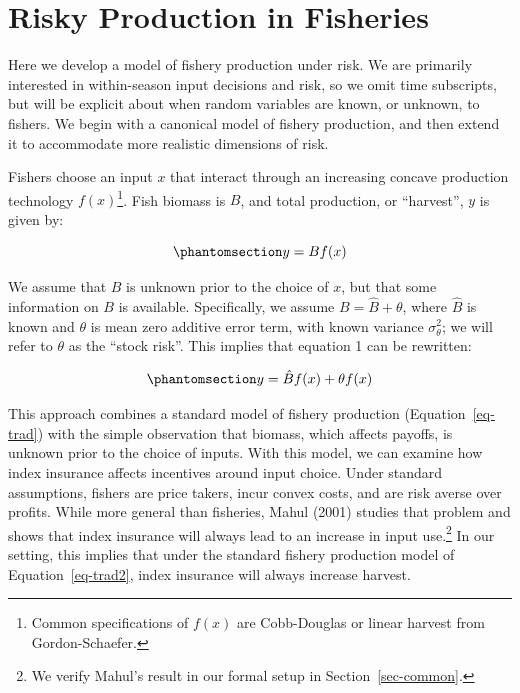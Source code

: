 \documentclass[
  letterpaper,
  DIV=11,
  numbers=noendperiod]{scrartcl}
\theoremstyle{plain}
\theoremstyle{plain}
\theoremstyle{remark}
\begin{document}
\section{Risky Production in Fisheries}\label{sec-jp}

Here we develop a model of fishery production under risk. We are
primarily interested in within-season input decisions and risk, so we
omit time subscripts, but will be explicit about when random variables
are known, or unknown, to fishers. We begin with a canonical model of
fishery production, and then extend it to accommodate more realistic
dimensions of risk.

Fishers choose an input \(x\) that interact through an increasing
concave production technology \(f(x)\)\footnote{Common specifications of
  \(f(x)\) are Cobb-Douglas or linear harvest from Gordon-Schaefer.}.
Fish biomass is \(B\), and total production, or ``harvest'', \(y\) is
given by:

\begin{equation}\phantomsection\label{eq-trad}{
y = Bf(x)
}\end{equation}

We assume that \(B\) is unknown prior to the choice of \(x\), but that
some information on \(B\) is available. Specifically, we assume
\(B=\hat{B}+\theta\), where \(\hat{B}\) is known and \(\theta\) is mean
zero additive error term, with known variance \(\sigma^2_\theta\); we
will refer to \(\theta\) as the ``stock risk''. This implies that
equation 1 can be rewritten:

\begin{equation}\phantomsection\label{eq-trad2}{
    y = \hat{B}f(x) + \theta f(x)
}\end{equation}

This approach combines a standard model of fishery production
(Equation~\ref{eq-trad}) with the simple observation that biomass, which
affects payoffs, is unknown prior to the choice of inputs. With this
model, we can examine how index insurance affects incentives around
input choice. Under standard assumptions, fishers are price takers,
incur convex costs, and are risk averse over profits. While more general
than fisheries, Mahul (2001) studies that problem and shows that index
insurance will always lead to an increase in input use.\footnote{We
  verify Mahul's result in our formal setup in Section~\ref{sec-common}.}
In our setting, this implies that under the standard fishery production
model of Equation~\ref{eq-trad2}, index insurance will always increase
harvest.
\end{document}
